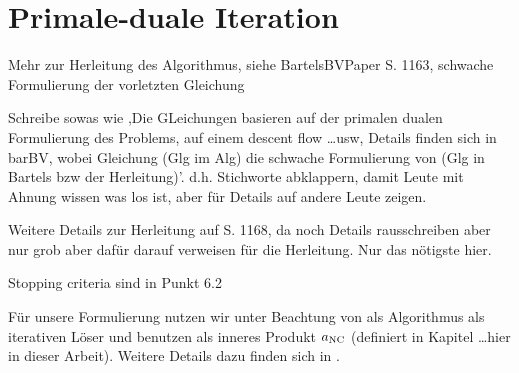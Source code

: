 \section{Primale-duale Iteration}
Mehr zur Herleitung des Algorithmus, siehe BartelsBVPaper S. 1163, schwache
Formulierung der vorletzten Gleichung

Schreibe sowas wie ,Die GLeichungen basieren auf der primalen dualen
Formulierung des Problems, auf einem descent flow \ldots usw,
Details finden sich in barBV, wobei Gleichung (Glg im Alg) die schwache
Formulierung von (Glg in Bartels bzw der Herleitung)'. d.h. Stichworte
abklappern, damit Leute mit Ahnung wissen was los ist, aber für Details
auf andere Leute zeigen.

Weitere Details zur Herleitung auf S. 1168, da noch Details rausschreiben
aber nur grob aber dafür darauf verweisen für die Herleitung. Nur das 
nötigste hier.


Stopping criteria sind in Punkt 6.2



Für unsere Formulierung  nutzen wir \cite[S. 314,
Algorithm 10.1]{Bar15} unter Beachtung von \cite[S. 314, Remark 10.11]{Bar15}
als Algorithmus als iterativen Löser und benutzen als inneres Produkt $a_\textup{NC}$
(definiert in Kapitel \ldots hier in dieser Arbeit).
Weitere Details dazu finden sich in \cite[S. 118-121]{Bar15}.

